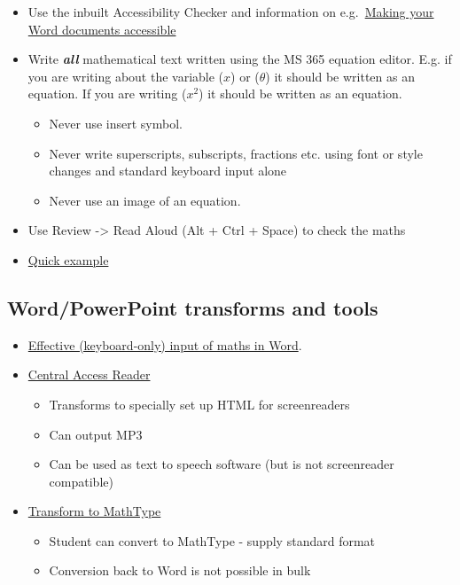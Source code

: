 \documentclass[
  12pt,
  a4-paperpaper,
  DIV=11,
  numbers=noendperiod]{scrartcl}
\providecommand{\tightlist}{%
  \setlength{\itemsep}{0pt}\setlength{\parskip}{0pt}}
\begin{document}
\begin{itemize}
\tightlist
\item
  Use the inbuilt Accessibility Checker and information on
  e.g.~\href{https://support.office.com/en-gb/article/make-your-word-documents-accessible-to-people-with-disabilities-d9bf3683-87ac-47ea-b91a-78dcacb3c66d}{Making
  your Word documents accessible}
\item
  Write \textbf{\emph{all}} mathematical text written using the MS 365
  equation editor. E.g. if you are writing about the variable (\(x\)) or
  (\(\theta\)) it should be written as an equation. If you are writing
  (\(x^2\)) it should be written as an equation.

  \begin{itemize}
  \tightlist
  \item
    Never use insert symbol.
  \item
    Never write superscripts, subscripts, fractions etc. using font or
    style changes and standard keyboard input alone
  \item
    Never use an image of an equation.
  \end{itemize}
\item
  Use Review -\textgreater{} Read Aloud (Alt + Ctrl + Space) to check
  the maths
\item
  \href{./example.docx}{Quick example}
\end{itemize}

\subsection{Word/PowerPoint transforms and
tools}\label{wordpowerpoint-transforms-and-tools}

\begin{itemize}
\tightlist
\item
  \href{https://bathmash.github.io/gettingstarted/Word/index.html}{Effective
  (keyboard-only) input of maths in Word}.
\item
  \href{https://www.cwu.edu/student-life/student-support/central-access/resources/reader.php}{Central
  Access Reader}

  \begin{itemize}
  \tightlist
  \item
    Transforms to specially set up HTML for screenreaders
  \item
    Can output MP3
  \item
    Can be used as text to speech software (but is not screenreader
    compatible)
  \end{itemize}
\item
  \href{https://www.wiris.com/en/mathtype/office-tools/}{Transform to
  MathType}

  \begin{itemize}
  \tightlist
  \item
    Student can convert to MathType - supply standard format
  \item
    Conversion back to Word is not possible in bulk
  \end{itemize}
\end{itemize}
\end{document}
